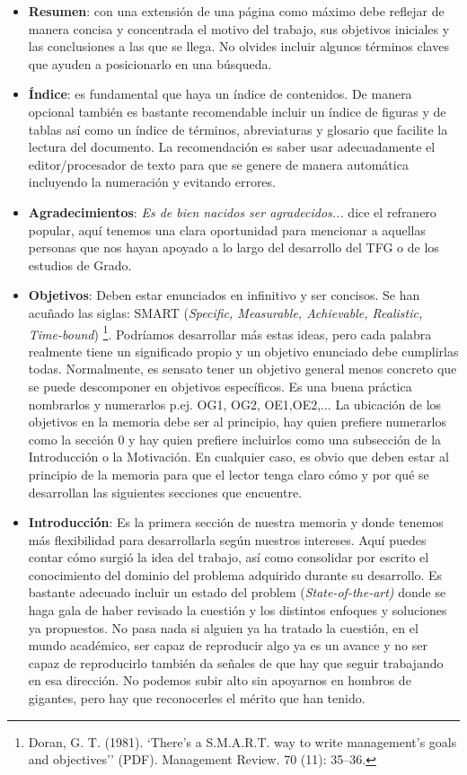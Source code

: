 \begin{itemize}
    \item \textbf{Resumen}: con una extensión de una página como máximo debe reflejar de manera concisa y concentrada el motivo del trabajo, sus objetivos iniciales y las conclusiones a las que se llega. No olvides incluir algunos términos claves que ayuden a posicionarlo en una búsqueda.
    \item \textbf{Índice}: es fundamental que haya un índice de contenidos. De manera opcional también es bastante recomendable incluir un índice de figuras y de tablas así como un índice de términos, abreviaturas y glosario que facilite la lectura del documento. La recomendación es saber usar adecuadamente el editor/procesador de texto para que se genere de manera automática incluyendo la numeración y evitando errores.
    \item \textbf{Agradecimientos}: {\it Es de bien nacidos ser agradecidos...} dice el refranero popular, aquí tenemos una clara oportunidad para mencionar a aquellas personas que nos hayan apoyado a lo largo del desarrollo del TFG o de los estudios de Grado. 
    \item \textbf{Objetivos}: Deben estar enunciados en infinitivo y ser concisos. Se han acuñado las siglas: SMART (\textit{Specific, Measurable, Achievable, Realistic, Time-bound}) \footnote{Doran, G. T. (1981). `There's a S.M.A.R.T. way to write management's goals and objectives'' (PDF). Management Review. 70 (11): 35–36.}. Podríamos desarrollar más estas ideas, pero cada palabra realmente tiene un significado propio y un objetivo enunciado debe cumplirlas todas. Normalmente, es sensato tener un objetivo general menos concreto que se puede descomponer en objetivos específicos. Es una buena práctica nombrarlos y numerarlos p.ej. OG1, OG2, OE1,OE2,... La ubicación de los objetivos en la memoria debe ser al principio, hay quien prefiere numerarlos como la sección 0 y hay quien prefiere incluirlos como una subsección de la Introducción o la Motivación. En cualquier caso, es obvio que deben estar al principio de la memoria para que el lector tenga claro cómo y por qué se desarrollan las siguientes secciones que encuentre.

    \item \textbf{Introducción}: Es la primera sección de nuestra memoria y donde tenemos más flexibilidad para desarrollarla según nuestros intereses. Aquí puedes contar cómo surgió la idea del trabajo, así como consolidar por escrito el conocimiento del dominio del problema adquirido durante su desarrollo. Es bastante adecuado incluir un estado del problem (\textit{State-of-the-art)} donde se haga gala de haber revisado la cuestión y los distintos enfoques y soluciones ya propuestos. No pasa nada si alguien ya ha tratado la cuestión, en el mundo académico, ser capaz de reproducir algo ya es un avance y no ser capaz de reproducirlo también da señales de que hay que seguir trabajando en esa dirección. No podemos subir alto sin apoyarnos en hombros de gigantes, pero hay que reconocerles el mérito que han tenido.


\end{itemize}
